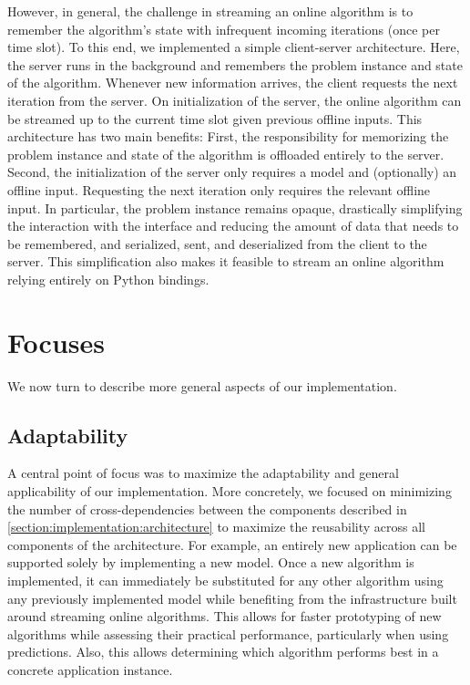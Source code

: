However, in general, the challenge in streaming an online algorithm is to remember the algorithm's state with infrequent incoming iterations (once per time slot). To this end, we implemented a simple client-server architecture. Here, the server runs in the background and remembers the problem instance and state of the algorithm. Whenever new information arrives, the client requests the next iteration from the server. On initialization of the server, the online algorithm can be streamed up to the current time slot given previous offline inputs. This architecture has two main benefits: First, the responsibility for memorizing the problem instance and state of the algorithm is offloaded entirely to the server. Second, the initialization of the server only requires a model and (optionally) an offline input. Requesting the next iteration only requires the relevant offline input. In particular, the problem instance remains opaque, drastically simplifying the interaction with the interface and reducing the amount of data that needs to be remembered, and serialized, sent, and deserialized from the client to the server. This simplification also makes it feasible to stream an online algorithm relying entirely on Python bindings.

\section{Focuses}

We now turn to describe more general aspects of our implementation.

\subsection{Adaptability}

A central point of focus was to maximize the adaptability and general applicability of our implementation. More concretely, we focused on minimizing the number of cross-dependencies between the components described in \cref{section:implementation:architecture} to maximize the reusability across all components of the architecture. For example, an entirely new application can be supported solely by implementing a new model. Once a new algorithm is implemented, it can immediately be substituted for any other algorithm using any previously implemented model while benefiting from the infrastructure built around streaming online algorithms. This allows for faster prototyping of new algorithms while assessing their practical performance, particularly when using predictions. Also, this allows determining which algorithm performs best in a concrete application instance.

